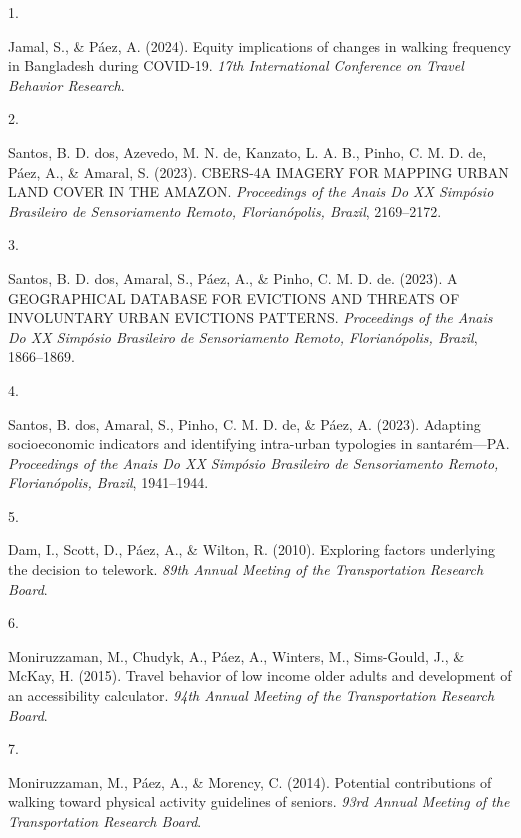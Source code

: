 \documentclass[11pt,a4paper,]{awesome-cv}
\newlength{\cslhangindent}
\newlength{\csllabelwidth}
\newenvironment{CSLReferences}[2] %
 {\begin{list}{}{%
  \setlength{\itemindent}{0pt}
  \setlength{\leftmargin}{0pt}
  \setlength{\parsep}{0pt}
  \ifodd #1
   \setlength{\leftmargin}{\cslhangindent}
   \setlength{\itemindent}{-1\cslhangindent}
  \fi
  \setlength{\itemsep}{#2\baselineskip}}}
 {\end{list}}
\newcommand{\CSLLeftMargin}[1]{\parbox[t]{\csllabelwidth}{\strut#1\strut}}
\newcommand{\CSLRightInline}[1]{\parbox[t]{\linewidth - \csllabelwidth}{\strut#1\strut}}
\begin{document}
\label{refs-a8dfc18e7b62e5f6a9a528dc485a91b6}
\begin{CSLReferences}{0}{0}
\CSLLeftMargin{1. }%
\CSLRightInline{Jamal, S., \& Páez, A. (2024). Equity implications of
changes in walking frequency in Bangladesh during COVID-19. \emph{17th
International Conference on Travel Behavior Research}.}

\CSLLeftMargin{2. }%
\CSLRightInline{Santos, B. D. dos, Azevedo, M. N. de, Kanzato, L. A. B.,
Pinho, C. M. D. de, Páez, A., \& Amaral, S. (2023). CBERS-4A IMAGERY FOR
MAPPING URBAN LAND COVER IN THE AMAZON. \emph{Proceedings of the Anais
Do XX Simpósio Brasileiro de Sensoriamento Remoto, Florianópolis,
Brazil}, 2169--2172.}

\CSLLeftMargin{3. }%
\CSLRightInline{Santos, B. D. dos, Amaral, S., Páez, A., \& Pinho, C. M.
D. de. (2023). A GEOGRAPHICAL DATABASE FOR EVICTIONS AND THREATS OF
INVOLUNTARY URBAN EVICTIONS PATTERNS. \emph{Proceedings of the Anais Do
XX Simpósio Brasileiro de Sensoriamento Remoto, Florianópolis, Brazil},
1866--1869.}

\CSLLeftMargin{4. }%
\CSLRightInline{Santos, B. dos, Amaral, S., Pinho, C. M. D. de, \& Páez,
A. (2023). Adapting socioeconomic indicators and identifying intra-urban
typologies in santarém---PA. \emph{Proceedings of the Anais Do XX
Simpósio Brasileiro de Sensoriamento Remoto, Florianópolis, Brazil},
1941--1944.}

\CSLLeftMargin{5. }%
\CSLRightInline{Dam, I., Scott, D., Páez, A., \& Wilton, R. (2010).
Exploring factors underlying the decision to telework. \emph{89th Annual
Meeting of the Transportation Research Board}.}

\CSLLeftMargin{6. }%
\CSLRightInline{Moniruzzaman, M., Chudyk, A., Páez, A., Winters, M.,
Sims-Gould, J., \& McKay, H. (2015). Travel behavior of low income older
adults and development of an accessibility calculator. \emph{94th Annual
Meeting of the Transportation Research Board}.}

\CSLLeftMargin{7. }%
\CSLRightInline{Moniruzzaman, M., Páez, A., \& Morency, C. (2014).
Potential contributions of walking toward physical activity guidelines
of seniors. \emph{93rd Annual Meeting of the Transportation Research
Board}.}


\end{CSLReferences}
\end{document}
